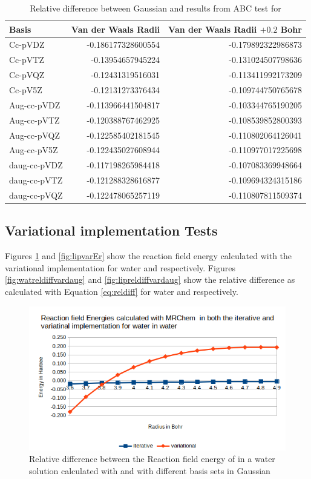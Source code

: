 \documentclass[../master_thesis.tex]{subfiles}
\begin{document}
\begin{table}[htbp]
\caption{Relative difference between Gaussian and \mrchem results from \ac{ABC}  test for }
\begin{tabular}{|l|r|r|}
\hline
Basis & \multicolumn{1}{l|}{Van der Waals Radii} & \multicolumn{1}{l|}{Van der Waals Radii $+ 0.2$ Bohr} \\ \hline
Cc-pVDZ & -0.186177328600554 & -0.179892322986873 \\ \hline
Cc-pVTZ & -0.13954657945224 & -0.131024507798636 \\ \hline
Cc-pVQZ & -0.12431319516031 & -0.113411992173209 \\ \hline
Cc-pV5Z & -0.12131273376434 & -0.109744750765678 \\ \hline
Aug-cc-pVDZ & -0.113966441504817 & -0.103344765190205 \\ \hline
Aug-cc-pVTZ & -0.120388767462925 & -0.108539852800393 \\ \hline
Aug-cc-pVQZ & -0.122585402181545 & -0.110802064126041 \\ \hline
Aug-cc-pV5Z & -0.122435027608944 & -0.110977017225698 \\ \hline
daug-cc-pVDZ & -0.117198265984418 & -0.107083369948664 \\ \hline
daug-cc-pVTZ & -0.121288328616877 & -0.109694324315186 \\ \hline
daug-cc-pVQZ & -0.122478065257119 & -0.110807811509374 \\ \hline
\end{tabular}
\label{tab:acetamidabcreldiff}
\end{table}



\subsection{Variational implementation Tests}
Figures \ref{fig:watvarEr} and \ref{fig:lipvarEr} show the reaction field energy
calculated with the variational implementation for water and 
respectively. Figures \ref{fig:watreldiffvardaug} and \ref{fig:lipreldiffvardaug} show the
relative difference as calculated with Equation \ref{eq:reldiff} for water and 
respectively.

\begin{figure}[h!]
  \centering
  \includegraphics[width=0.75\linewidth]{img/watvarEr.png}
  \caption{Relative difference between the Reaction field energy of  in a water solution calculated with \mrchem
  and with different basis sets in Gaussian}
  \label{fig:watvarEr}
\end{figure}
\end{document}
